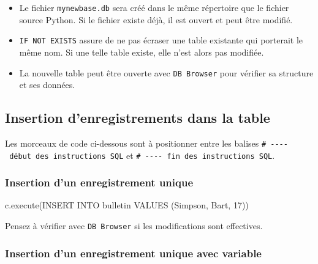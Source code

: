 \documentclass[
  letterpaper,
  DIV=11,
  numbers=noendperiod]{scrartcl}
\newenvironment{Shaded}{\begin{snugshade}}{\end{snugshade}}
\newcommand{\NormalTok}[1]{\textcolor[rgb]{0.00,0.23,0.31}{#1}}
\newcommand{\StringTok}[1]{\textcolor[rgb]{0.13,0.47,0.30}{#1}}
\providecommand{\tightlist}{%
  \setlength{\itemsep}{0pt}\setlength{\parskip}{0pt}}\usepackage{longtable,booktabs,array}
\begin{document}
\begin{itemize}
\tightlist
\item
  Le fichier \texttt{mynewbase.db} sera créé dans le même répertoire que
  le fichier source Python. Si le fichier existe déjà, il est ouvert et
  peut être modifié.
\item
  \texttt{IF\ NOT\ EXISTS} assure de ne pas écraser une table existante
  qui porterait le même nom. Si une telle table existe, elle n'est alors
  pas modifiée.
\item
  La nouvelle table peut être ouverte avec \texttt{DB\ Browser} pour
  vérifier sa structure et ses données.
\end{itemize}

\hypertarget{insertion-denregistrements-dans-la-table}{%
\subsection{Insertion d'enregistrements dans la
table}\label{insertion-denregistrements-dans-la-table}}

Les morceaux de code ci-dessous sont à positionner entre les balises
\texttt{\#\ -\/-\/-\/-\ début\ des\ instructions\ SQL} et
\texttt{\#\ -\/-\/-\/-\ fin\ des\ instructions\ SQL}.

\hypertarget{insertion-dun-enregistrement-unique}{%
\subsubsection{Insertion d'un enregistrement
unique}\label{insertion-dun-enregistrement-unique}}

\begin{Shaded}
\begin{Highlighting}[]
\NormalTok{c.execute(}\StringTok{\textquotesingle{}\textquotesingle{}\textquotesingle{}INSERT INTO bulletin VALUES (\textquotesingle{}Simpson\textquotesingle{}, \textquotesingle{}Bart\textquotesingle{}, 17)\textquotesingle{}\textquotesingle{}\textquotesingle{}}\NormalTok{)}
\end{Highlighting}
\end{Shaded}

Pensez à vérifier avec \texttt{DB\ Browser} si les modifications sont
effectives.

\hypertarget{insertion-dun-enregistrement-unique-avec-variable}{%
\subsubsection{Insertion d'un enregistrement unique avec
variable}\label{insertion-dun-enregistrement-unique-avec-variable}}
\end{document}
